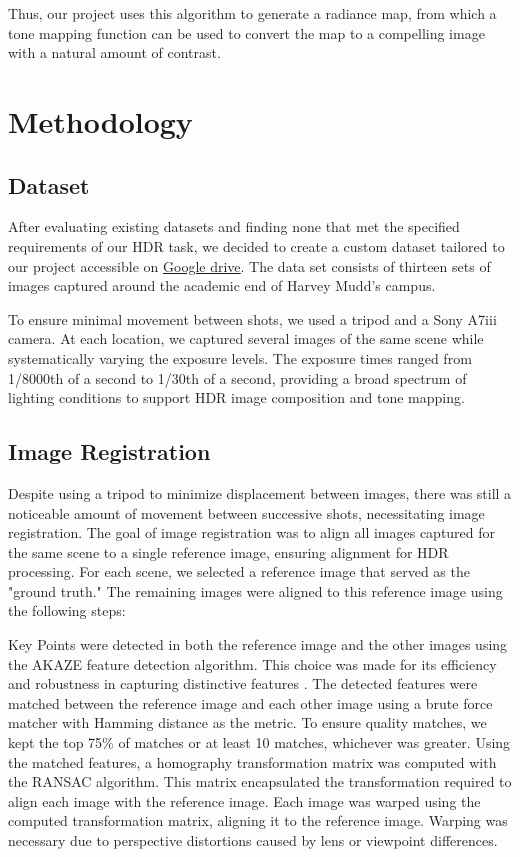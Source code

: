 \documentclass[
	a4paper, %
	10pt, %
	unnumberedsections, %
	twoside, %
]{LTJournalArticle}
\begin{document}
Thus, our project uses this algorithm to generate a radiance map, from which a tone mapping function can be used to convert the map to a compelling image with a natural amount of contrast.


\section{Methodology}

\subsection{Dataset}
After evaluating existing datasets and finding none that met the specified requirements of our HDR task, we decided to create a custom dataset tailored to our project accessible on \underline{\href{https://drive.google.com/drive/folders/1f8BAv3cZWv1MtfIDVDXO2MoX68-QR-a4?usp=share_link}{Google drive}}. The data set consists of thirteen sets of images captured around the academic end of Harvey Mudd’s campus. 

To ensure minimal movement between shots, we used a tripod and a Sony A7iii camera. At each location, we captured several images of the same scene while systematically varying the exposure levels. The exposure times ranged from 1/8000th of a second to 1/30th of a second, providing a broad spectrum of lighting conditions to support HDR image composition and tone mapping.  

\subsection{Image Registration}
Despite using a tripod to minimize displacement between images, there was still a noticeable amount of movement between successive shots, necessitating image registration. The goal of image registration was to align all images captured for the same scene to a single reference image, ensuring alignment for HDR processing.
For each scene, we selected a reference image that served as the "ground truth." The remaining images were aligned to this reference image using the following steps:

Key Points were detected in both the reference image and the other images using the AKAZE feature detection algorithm. This choice was made for its efficiency and robustness in capturing distinctive features \autocite{registration}. The detected features were matched between the reference image and each other image using a brute force matcher with Hamming distance as the metric. To ensure quality matches, we kept the top 75\% of matches or at least 10 matches, whichever was greater. Using the matched features, a homography transformation matrix was computed with the RANSAC algorithm. This matrix encapsulated the transformation required to align each image with the reference image. Each image was warped using the computed transformation matrix, aligning it to the reference image. Warping was necessary due to perspective distortions caused by lens or viewpoint differences. 
\end{document}
